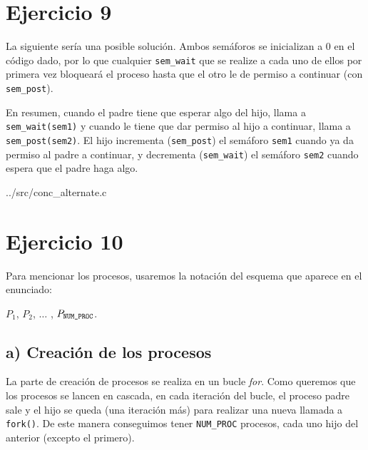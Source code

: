 \documentclass{article}
\begin{document}
\section*{Ejercicio 9}
La siguiente sería una posible solución. Ambos semáforos se inicializan a $0$ en el código dado, por lo que cualquier \texttt{sem\_wait} que se realize a cada uno de ellos por primera vez bloqueará el proceso hasta que el otro le de permiso a continuar (con \texttt{sem\_post}).

En resumen, cuando el padre tiene que esperar algo del hijo, llama a \texttt{sem\_wait(sem1)} y cuando le tiene que dar permiso al hijo a continuar, llama a \texttt{sem\_post(sem2)}. El hijo incrementa (\texttt{sem\_post}) el semáforo \texttt{sem1} cuando ya da permiso al padre a continuar, y decrementa (\texttt{sem\_wait}) el semáforo \texttt{sem2} cuando espera que el padre haga algo.


{../src/conc_alternate.c}


\pagebreak

\section*{Ejercicio 10}

Para mencionar los procesos, usaremos la notación del esquema que aparece en el enunciado: 

\noindent$P_1$, $P_2$, $\dots$ , $P_\texttt{\scriptsize{NUM\_PROC}}$.

\subsection*{a) Creación de los procesos} 

La parte de creación de procesos se realiza en un bucle \textit{for}. Como queremos que los procesos se lancen en cascada, en cada iteración del bucle, el proceso padre sale y el hijo se queda (una iteración más) para realizar una nueva llamada a \texttt{fork()}. De este manera conseguimos tener \texttt{NUM\_PROC} procesos, cada uno hijo del anterior (excepto el primero).
\end{document}

